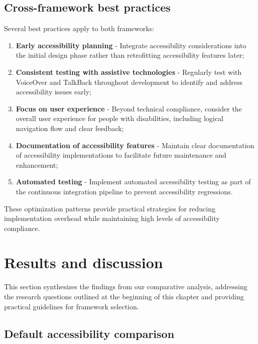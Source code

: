 \subsection{Cross-framework best practices}
\label{subsec:cross-framework-practices}

Several best practices apply to both frameworks:

\begin{enumerate}
    \item \textbf{Early accessibility planning} - Integrate accessibility considerations into the initial design phase rather than retrofitting accessibility features later;
    
    \item \textbf{Consistent testing with assistive technologies} - Regularly test with VoiceOver and TalkBack throughout development to identify and address accessibility issues early;
    
    \item \textbf{Focus on user experience} - Beyond technical compliance, consider the overall user experience for people with disabilities, including logical navigation flow and clear feedback;
    
    \item \textbf{Documentation of accessibility features} - Maintain clear documentation of accessibility implementations to facilitate future maintenance and enhancement;
    
    \item \textbf{Automated testing} - Implement automated accessibility testing as part of the continuous integration pipeline to prevent accessibility regressions.
\end{enumerate}

These optimization patterns provide practical strategies for reducing implementation overhead while maintaining high levels of accessibility compliance.

\section{Results and discussion}
\label{sec:results-discussion}

This section synthesizes the findings from our comparative analysis, addressing the research questions outlined at the beginning of this chapter and providing practical guidelines for framework selection.

\subsection{Default accessibility comparison}
\label{subsec:default-accessibility}

